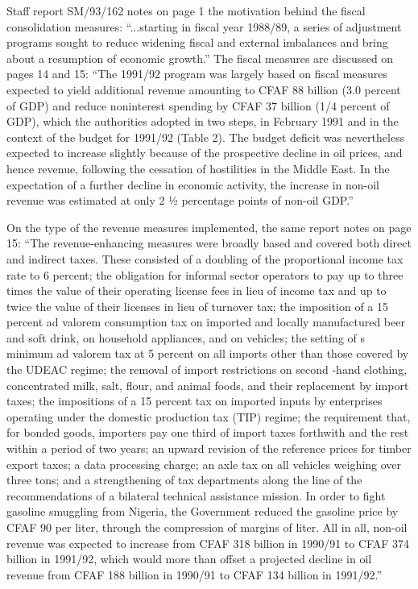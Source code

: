 Staff report SM/93/162 notes on page 1 the motivation behind the fiscal consolidation measures: “...starting in fiscal year 1988/89, a series of adjustment programs sought to reduce widening fiscal and external imbalances and bring about a resumption of economic growth.” The fiscal measures are discussed on pages 14 and 15: “The 1991/92 program was largely based on fiscal measures expected to yield additional revenue amounting to CFAF 88 billion (3.0 percent of GDP) and reduce noninterest spending by CFAF 37 billion (1/4 percent of GDP), which the authorities adopted in two steps, in February 1991 and in the context of the budget for 1991/92 (Table 2). The budget deficit was nevertheless expected to increase slightly because of the prospective decline in oil prices, and hence revenue, following the cessation of hostilities in the Middle East. In the expectation of a further decline in economic activity, the increase in non-oil revenue was estimated at only 2 ½ percentage points of non-oil GDP.”

On the type of the revenue measures implemented, the same report notes on page 15: “The revenue-enhancing measures were broadly based and covered both direct and indirect taxes. These consisted of a doubling of the proportional income tax rate to 6 percent; the obligation for informal sector operators to pay up to three times the value of their operating license fees in lieu of income tax and up to twice the value of their licenses in lieu of turnover tax; the imposition of a 15 percent ad valorem consumption tax on imported and locally manufactured beer and soft drink, on household appliances, and on vehicles; the setting of s minimum ad valorem tax at 5 percent on all imports other than those covered by the UDEAC regime; the removal of import restrictions on second -hand clothing, concentrated milk, salt, flour, and animal foods, and their replacement by import taxes; the impositions of a 15 percent tax on imported inputs by enterprises operating under the domestic production tax (TIP) regime; the requirement that, for bonded goods, importers pay one third of import taxes forthwith and the rest within a period of two years; an upward revision of the reference prices for timber export taxes; a data processing charge; an axle tax on all vehicles weighing over three tons; and a strengthening of tax departments along the line of the recommendations of a bilateral technical assistance mission. In order to fight gasoline smuggling from Nigeria, the Government reduced the gasoline price by CFAF 90 per liter, through the compression of margins of liter. All in all, non-oil revenue was expected to increase from CFAF 318 billion in 1990/91 to CFAF 374 billion in 1991/92, which would more than offset a projected decline in oil revenue from CFAF 188 billion in 1990/91 to CFAF 134 billion in 1991/92.”

